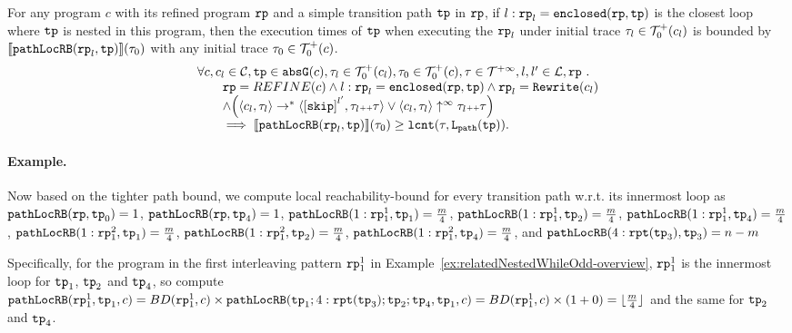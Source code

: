 \begin{lem}
  \label{lem:pathlocalrb-sound}
  For any program $c$ with its refined program $\mathtt{rp}$ and a simple transition path $\mathtt{tp}$ in $\mathtt{rp}$,
  if $l: \mathtt{rp}_l = \mathtt{enclosed}(\mathtt{rp}, \mathtt{tp})$ is the closest loop where $\mathtt{tp}$ is nested in this program,
  then the execution times of $\mathtt{tp}$ when executing the $\mathtt{rp}_l$ under initial trace $\mathtt{\tau}_l \in \mathcal{T}^{+}_0(c_l)$ is bounded by $\llbracket \mathtt{pathLocRB}(\mathtt{rp}_l, \mathtt{tp}) \rrbracket(\mathtt{\tau}_0)$ with any initial trace $\mathtt{\tau}_0 \in \mathcal{T}^{+}_0(c)$.
  \[
    \begin{array}{l}
    \forall c, c_l \in \cdom, \tpath \in \absG(c), 
    \trace_l \in \ftdom_0(c_l), \trace_0 \in \ftdom_0(c), \trace \in \tdom, l, l' \in \ldom, \rprog \st 
    \\ \qquad
    \rprog = REFINE(c)
    \land
    l: \rprog_l = \kw{enclosed}(\rprog, \tpath)
    \land 
    \rprog_l = \algrewrite(c_l)
    \\ \qquad
    \land
    \Big(
    \config{c_l, \trace_l} \rightarrow^* \config{\clabel{\eskip}^{l'}, \trace_l \tracecat \trace}
    \lor \config{c_l, \trace_l} \uparrow^{\infty} \trace_l \tracecat \trace 
    \Big)
    \\ \qquad
    \implies
    \econfig{\outinB(\rprog_l, \tpath)}(\trace_0) \geq \lcounter(\trace, \pathl(\tpath)).
    \end{array}
  \]  
\end{lem}


\paragraph{Example.}
Now based on the tighter path bound,
we compute local reachability-bound for every transition path w.r.t. its innermost loop as
$\mathtt{pathLocRB}(\mathtt{rp}, \mathtt{tp}_0) = 1$,
$\mathtt{pathLocRB}(\mathtt{rp}, \mathtt{tp}_4) = 1$,
$\mathtt{pathLocRB}(1: \mathtt{rp}_1^1, \mathtt{tp}_1) = \frac{m}{4}$,
$\mathtt{pathLocRB}(1: \mathtt{rp}_1^1, \mathtt{tp}_2) = \frac{m}{4}$,
$\mathtt{pathLocRB}(1: \mathtt{rp}_1^1, \mathtt{tp}_4) = \frac{m}{4}$,
$\mathtt{pathLocRB}(1: \mathtt{rp}_1^2, \mathtt{tp}_1) = \frac{m}{4}$,
$\mathtt{pathLocRB}(1: \mathtt{rp}_1^2, \mathtt{tp}_2) = \frac{m}{4}$,
$\mathtt{pathLocRB}(1: \mathtt{rp}_1^2, \mathtt{tp}_4) = \frac{m}{4}$, and
$\mathtt{pathLocRB}(4: \mathtt{rpt}(\mathtt{tp}_3), \mathtt{tp}_3) = n - m$ 

Specifically, for the program in the first interleaving pattern $\mathtt{rp}_1^1$ in Example~\ref{ex:relatedNestedWhileOdd-overview}, $\mathtt{rp}_1^1$ is the innermost loop for $\mathtt{tp}_1$, $\mathtt{tp}_2$ and $\mathtt{tp}_4$, 
so compute $\mathtt{pathLocRB}(\mathtt{rp}_1^1, \mathtt{tp}_1, c) = BD(\mathtt{rp}_1^1, c) \times \mathtt{pathLocRB}(\mathtt{tp}_1; 4:\mathtt{rpt}(\mathtt{tp}_3); \mathtt{tp}_2; \mathtt{tp}_4, \mathtt{tp}_1, c)
= BD(\mathtt{rp}_1^1, c) \times (1 + 0) = \lfloor \frac{m}{4} \rfloor $ and the same for $\mathtt{tp}_2$ and $\mathtt{tp}_4$.


